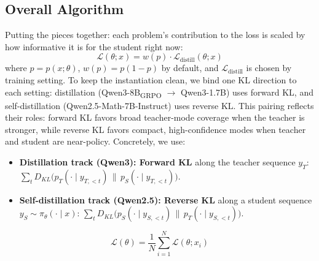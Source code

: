 \documentclass{article}
\begin{document}
\subsection{Overall Algorithm}
\label{sec:overall}

Putting the pieces together: each problem's contribution to the loss is scaled by how informative it is for the student right now:
\begin{equation}
  \mathcal{L}(\theta; x) = w(p) \cdot \mathcal{L}_{\text{distill}}(\theta; x)
  \label{eq:per_sample_loss}
\end{equation}
where $p = p(x; \theta)$, $w(p) = p(1-p)$ by default, and $\mathcal{L}_{\text{distill}}$ is chosen by training setting. To keep the instantiation clean, we bind one KL direction to each setting: distillation (Qwen3-8B\textsubscript{GRPO} $\to$ Qwen3-1.7B) uses forward KL, and self-distillation (Qwen2.5-Math-7B-Instruct) uses reverse KL. This pairing reflects their roles: forward KL favors broad teacher-mode coverage when the teacher is stronger, while reverse KL favors compact, high-confidence modes when teacher and student are near-policy. Concretely, we use:
\begin{itemize}
  \item \textbf{Distillation track (Qwen3): Forward KL} along the teacher sequence $y_T$: $\sum_t D_{KL}\!\bigl(p_T(\cdot \mid y_{T,<t})\,\|\,p_S(\cdot \mid y_{T,<t})\bigr)$.
  \item \textbf{Self-distillation track (Qwen2.5): Reverse KL} along a student sequence $y_S \sim \pi_\theta(\cdot \mid x)$: $\sum_t D_{KL}\!\bigl(p_S(\cdot \mid y_{S,<t})\,\|\,p_T(\cdot \mid y_{S,<t})\bigr)$.
\end{itemize}
\begin{equation}
  \mathcal{L}(\theta) = \frac{1}{N} \sum_{i=1}^{N} \mathcal{L}(\theta; x_i)
  \label{eq:total_loss}
\end{equation}
\end{document}
